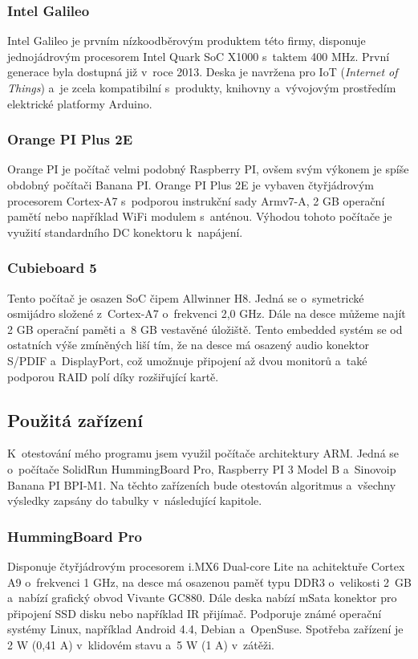 \subsubsection*{Intel Galileo}
Intel Galileo je prvním nízkoodběrovým produktem této firmy, disponuje jednojádrovým procesorem Intel Quark SoC X1000 s~taktem 400 MHz. První generace byla dostupná již v~roce 2013. Deska je navržena pro IoT (\textit{Internet of Things}) a~je zcela kompatibilní s~produkty, knihovny a~vývojovým prostředím elektrické platformy Arduino. 

\subsubsection*{Orange PI Plus 2E}
Orange PI je počítač velmi podobný Raspberry PI, ovšem svým výkonem je spíše obdobný počítači Banana PI. Orange PI Plus 2E je vybaven čtyřjádrovým procesorem Cortex-A7 s~podporou instrukční sady Armv7-A, 2 GB operační pamětí nebo například WiFi modulem s~anténou. Výhodou tohoto počítače je využití standardního DC konektoru k~napájení.

\subsubsection*{Cubieboard 5}
Tento počítač je osazen SoC čipem Allwinner H8. Jedná se o~symetrické osmijádro složené z~Cortex-A7 o~frekvenci 2,0 GHz. Dále na desce můžeme najít 2 GB operační paměti a~8 GB vestavěné úložiště. Tento embedded systém se od ostatních výše zmíněných liší tím, že na desce má osazený audio konektor S/PDIF a~DisplayPort, což umožnuje připojení až dvou monitorů a~také podporou RAID polí díky rozšiřující kartě. 

\subsection{Použitá zařízení}
K~otestování mého programu jsem využil počítače architektury ARM. Jedná se o~počítače SolidRun HummingBoard Pro, Raspberry PI 3 Model B a~Sinovoip Banana PI BPI-M1. Na těchto zařízeních bude otestován algoritmus a~všechny výsledky zapsány do tabulky v~následující kapitole.

\subsubsection*{HummingBoard Pro}
 Disponuje čtyřjádrovým procesorem i.MX6 Dual-core Lite na achitektuře Cortex A9 o~frekvenci 1 GHz, na desce má osazenou paměť typu DDR3 o~velikosti 2~GB a~nabízí grafický obvod Vivante GC880. Dále deska nabízí mSata konektor pro připojení SSD disku nebo například IR přijímač. Podporuje známé operační systémy Linux, například Android 4.4, Debian a~OpenSuse. Spotřeba zařízení je 2 W (0,41 A) v~klidovém stavu a~5 W (1 A) v~zátěži.

